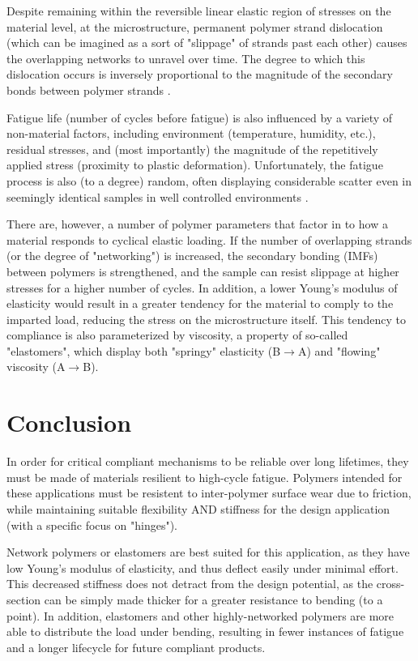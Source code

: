 \documentclass{report}
\begin{document}
Despite remaining within the reversible linear elastic region of stresses on the material level, 
at the microstructure, permanent polymer strand dislocation (which can be imagined as a sort of 
"slippage" of strands past each other) causes the overlapping networks to unravel over time.
The degree to which this dislocation occurs is inversely proportional to the magnitude of the secondary bonds between
polymer strands \cite{fatigue}.

Fatigue life (number of cycles before fatigue) is also influenced by a variety of non-material factors, including 
environment (temperature, humidity, etc.), residual stresses, and (most importantly) the magnitude 
of the repetitively applied stress (proximity to plastic deformation). Unfortunately, the fatigue 
process is also (to a degree) random, often displaying considerable scatter even in seemingly 
identical samples in well controlled environments \cite{fatigue}.

There are, however, a number of polymer parameters that factor in to how a material responds to
cyclical elastic loading. If the number of overlapping strands (or the degree of "networking") is
increased, the secondary bonding (IMFs) between polymers is strengthened, and the sample can resist
slippage at higher stresses for a higher number of cycles. In addition, a lower Young's modulus of
elasticity would result in a greater tendency for the material to comply to the imparted load, reducing
the stress on the microstructure itself. This tendency to compliance is also parameterized by viscosity,
a property of so-called "elastomers", which display both "springy" elasticity (B$\to$A) and "flowing" viscosity (A$\to$B).

\section{Conclusion}

In order for critical compliant mechanisms to be reliable over long lifetimes, they must be made of 
materials resilient to high-cycle fatigue. Polymers intended for these applications must be resistent 
to inter-polymer surface wear due to friction, while maintaining suitable flexibility AND stiffness for the design 
application (with a specific focus on "hinges").

Network polymers or elastomers are best suited for this application, as they have low Young's modulus of elasticity,
and thus deflect easily under minimal effort. This decreased stiffness does not detract from the design potential, as the cross-section
can be simply made thicker for a greater resistance to bending (to a point). In addition, elastomers and other highly-networked polymers
are more able to distribute the load under bending, resulting in fewer instances of fatigue and a longer lifecycle for future
compliant products.

\pagebreak




\end{document}
